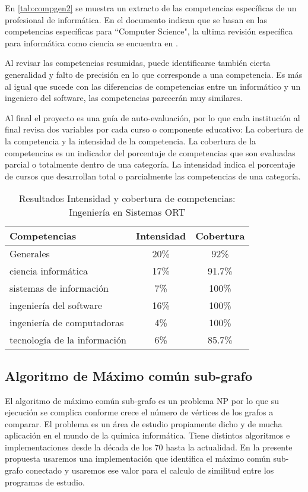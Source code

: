 En  \ref{tab:compgen2} se muestra un extracto de las competencias específicas de un profesional de informática. En el documento indican que se basan en las competencias específicas para ``Computer Science"\space, la ultima revisión específica para informática como ciencia se encuentra en \citep{acm2013}.


Al revisar las competencias resumidas, puede identificarse también cierta generalidad y falto de precisión en lo que corresponde a una competencia. Es más al igual que sucede con las diferencias de competencias entre un informático y un ingeniero del software, las competencias parecerán muy similares.

Al final el proyecto es una guía de auto-evaluación, por lo que cada institución al final revisa dos variables por cada curso o componente educativo: La cobertura de la competencia y la intensidad de la competencia. La cobertura de la competencias es un indicador del porcentaje de competencias que son evaluadas parcial o totalmente dentro de una categoría. La intensidad indica el porcentaje de cursos que desarrollan total o parcialmente las competencias de una categoría.


\begin{table}[h]
\centering
\caption{Resultados Intensidad y cobertura de competencias: Ingeniería en Sistemas ORT}
\begin{tabular}[t]{lcc}
\hline
Competencias&Intensidad&Cobertura\\
\hline
Generales&20\%&92\%\\
ciencia informática&17\%&91.7\%\\
sistemas de información&7\%&100\%\\
ingeniería del software&16\%&100\%\\
ingeniería de computadoras&4\%&100\%\\
tecnología de la información&6\%&85.7\%\\
\hline
\end{tabular}
\label{tab:compgen3}
\end{table}


\subsection {Algoritmo de Máximo común sub-grafo}\label{Algoritmo}

El algoritmo de máximo común sub-grafo es un problema NP por lo que su ejecución se complica conforme crece el número de vértices de los grafos a comparar. El problema es un área de estudio propiamente dicho y de mucha aplicación en el mundo de la química informática. Tiene distintos algoritmos e implementaciones desde la década de los 70 hasta la actualidad. En la presente propuesta usaremos una implementación que identifica el máximo común sub-grafo conectado y usaremos ese valor para el calculo de similitud entre los programas de estudio. 

